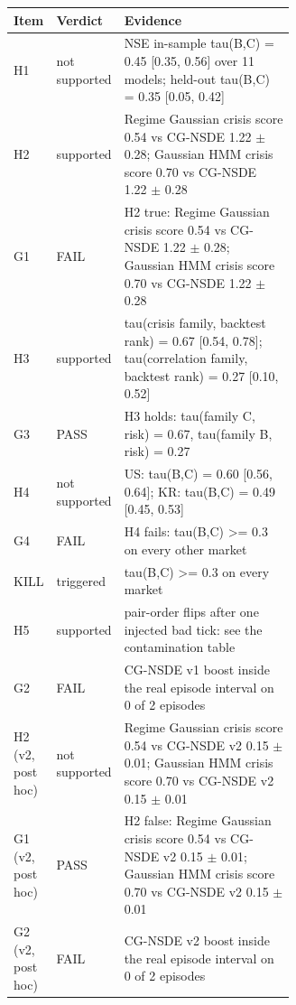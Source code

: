 \begin{tabular}{llp{0.62\linewidth}}
\toprule
Item & Verdict & Evidence \\
\midrule
H1 & not supported & NSE in-sample tau(B,C) = 0.45 [0.35, 0.56] over 11 models; held-out tau(B,C) = 0.35 [0.05, 0.42] \\
H2 & supported & Regime Gaussian crisis score 0.54 vs CG-NSDE 1.22 $\pm$ 0.28; Gaussian HMM crisis score 0.70 vs CG-NSDE 1.22 $\pm$ 0.28 \\
G1 & FAIL & H2 true: Regime Gaussian crisis score 0.54 vs CG-NSDE 1.22 $\pm$ 0.28; Gaussian HMM crisis score 0.70 vs CG-NSDE 1.22 $\pm$ 0.28 \\
H3 & supported & tau(crisis family, backtest rank) = 0.67 [0.54, 0.78]; tau(correlation family, backtest rank) = 0.27 [0.10, 0.52] \\
G3 & PASS & H3 holds: tau(family C, risk) = 0.67, tau(family B, risk) = 0.27 \\
H4 & not supported & US: tau(B,C) = 0.60 [0.56, 0.64]; KR: tau(B,C) = 0.49 [0.45, 0.53] \\
G4 & FAIL & H4 fails: tau(B,C) >= 0.3 on every other market \\
KILL & triggered & tau(B,C) >= 0.3 on every market \\
H5 & supported & pair-order flips after one injected bad tick: see the contamination table \\
G2 & FAIL & CG-NSDE v1 boost inside the real episode interval on 0 of 2 episodes \\
H2 (v2, post hoc) & not supported & Regime Gaussian crisis score 0.54 vs CG-NSDE v2 0.15 $\pm$ 0.01; Gaussian HMM crisis score 0.70 vs CG-NSDE v2 0.15 $\pm$ 0.01 \\
G1 (v2, post hoc) & PASS & H2 false: Regime Gaussian crisis score 0.54 vs CG-NSDE v2 0.15 $\pm$ 0.01; Gaussian HMM crisis score 0.70 vs CG-NSDE v2 0.15 $\pm$ 0.01 \\
G2 (v2, post hoc) & FAIL & CG-NSDE v2 boost inside the real episode interval on 0 of 2 episodes \\
\bottomrule
\end{tabular}
